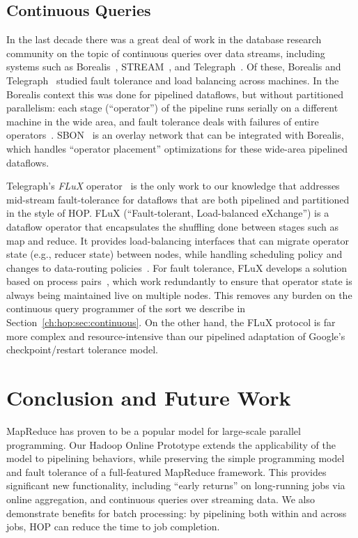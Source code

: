 \subsection{Continuous Queries}
In the last decade there was a great deal of work in the database research
community on the topic of continuous queries over data streams, including
systems such as Borealis~\cite{borealis}, STREAM~\cite{stream}, and
Telegraph~\cite{tcq-cidr}.  Of these, Borealis and Telegraph~\cite{flux-ft}
studied fault tolerance and load balancing across machines.  In the Borealis
context this was done for pipelined dataflows, but without partitioned
parallelism: each stage (``operator'') of the pipeline runs serially on a
different machine in the wide area, and fault tolerance deals with failures of
entire operators~\cite{borealisFT}.  SBON~\cite{sbon} is an overlay network that
can be integrated with Borealis, which handles ``operator placement''
optimizations for these wide-area pipelined dataflows.

Telegraph's \emph{FLuX} operator~\cite{flux-ft,flux-lb} is the only work to our
knowledge that addresses mid-stream fault-tolerance for dataflows that are both
pipelined and partitioned in the style of HOP\@. FLuX (``Fault-tolerant,
Load-balanced eXchange'') is a dataflow operator that encapsulates the shuffling
done between stages such as map and reduce.  It provides load-balancing
interfaces that can migrate operator state (e.g., reducer state) between nodes,
while handling scheduling policy and changes to data-routing
policies~\cite{flux-lb}.  For fault tolerance, FLuX develops a solution based on
process pairs~\cite{flux-ft}, which work redundantly to ensure that operator
state is always being maintained live on multiple nodes.  This removes any
burden on the continuous query programmer of the sort we describe in
Section~\ref{ch:hop:sec:continuous}.  On the other hand, the FLuX protocol is far more
complex and resource-intensive than our pipelined adaptation of Google's
checkpoint/restart tolerance model.

\section{Conclusion and Future Work}
\label{ch:hop:sec:concl}
MapReduce has proven to be a popular model for large-scale parallel programming. Our Hadoop Online Prototype extends the applicability of the model to pipelining behaviors, while preserving the simple programming model and fault tolerance of a full-featured MapReduce framework.  This provides significant new functionality, including ``early returns'' on long-running jobs via online aggregation, and continuous queries over streaming data.  We also demonstrate benefits for batch processing:  by pipelining both within and across jobs, HOP can 
reduce the time to job completion. 

